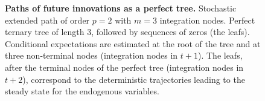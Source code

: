 \documentclass[a4paper,11pt]{amsart}
\makeatletter
\newcommand{\addresseshere}{%
  \enddoc@text\let\enddoc@text\relax
}
\makeatother
\begin{document}
\addresseshere


\newpage

\printbibliography

\newpage
\appendix

\begin{figure}[H]
   \centering
   {\tiny
      }
   \bigskip\bigskip
   \caption{\textbf{Paths of  future innovations as a perfect tree.} Stochastic extended path of order $p=2$ with $m=3$ integration nodes. Perfect ternary tree of length 3, followed by sequences of zeros (the leafs). Conditional expectations are estimated at the root of the tree and at three non-terminal nodes (integration nodes in $t+1$). The leafs, after the terminal nodes of the perfect tree (integration nodes in $t+2$), correspond to the deterministic trajectories leading to the steady state for the endogenous variables.}
   \label{fig:sep:tree}
\end{figure}
\end{document}
